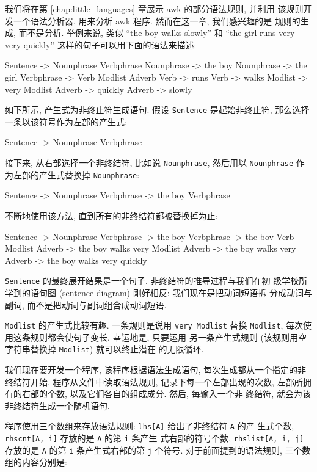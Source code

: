 {我们将在第 \ref{chap:little_languages} 章展示 awk 的部分语法规则, 并利用
该规则开发一个语法分析器, 用来分析 awk 程序. 然而在这一章, 我们感兴趣的是
规则的生成, 而不是分析. 举例来说, 类似 ``the boy walks slowly'' 和 ``the
girl runs very very quickly'' 这样的句子可以用下面的语法来描述:
\begin{file}
    Sentence -> Nounphrase Verbphrase
    Nounphrase -> the boy
    Nounphrase -> the girl
    Verbphrase -> Verb Modlist Adverb
    Verb -> runs
    Verb -> walks
    Modlist -> very Modlist
    Adverb -> quickly
    Adverb -> slowly
\end{file}

如下所示, 产生式为非终止符生成语句. 假设 \texttt{Sentence} 是起始非终止符,
那么选择一条以该符号作为左部的产生式:
\begin{file}
    Sentence -> Nounphrase Verbphrase
\end{file}
接下来, 从右部选择一个非终结符, 比如说 \texttt{Nounphrase}, 然后用以
\texttt{Nounphrase} 作为左部的产生式替换掉 \texttt{Nounphrase}:
\begin{file}
    Sentence -> Nounphrase Verbphrase
             -> the boy Verbphrase
\end{file}
不断地使用该方法, 直到所有的非终结符都被替换掉为止:
\begin{file}
    Sentence -> Nounphrase Verbphrase
             -> the boy Verbphrase
             -> the bov Verb Modlist Adverb
             -> the boy walks very Modlist Adverb
             -> the boy walks very Adverb
             -> the boy walks very quickly
\end{file}
\texttt{Sentence} 的最终展开结果是一个句子. 非终结符的推导过程与我们在初
级学校所学到的语句图 (sentence-diagram) 刚好相反: 我们现在是把动词短语拆
分成动词与副词, 而不是把动词与副词组合成动词短语.

\texttt{Modlist} 的产生式比较有趣. 一条规则是说用 \texttt{very Modlist}
替换 \texttt{Modlist}, 每次使用这条规则都会使句子变长. 幸运地是, 只要运用
另一条产生式规则 (该规则用空字符串替换掉 \texttt{Modlist}) 就可以终止潜在
的无限循环.

我们现在要开发一个程序, 该程序根据语法生成语句, 每次生成都从一个指定的非
终结符开始. 程序从文件中读取语法规则, 记录下每一个左部出现的次数, 
左部所拥有的右部的个数, 以及它们各自的组成成分. 然后, 每输入一个非
终结符, 就会为该非终结符生成一个随机语句.

程序使用三个数组来存放语法规则:
\texttt{lhs[A]} 给出了非终结符 \texttt{A} 的产 
生式个数, \texttt{rhscnt[A, i]} 存放的是 \texttt{A} 的第 \texttt{i} 条产生
式右部的符号个数, \texttt{rhslist[A, i, j]} 存放的是 \texttt{A} 的第 
\texttt{i} 条产生式右部的第 \texttt{j} 个符号. 对于前面提到的语法规则, 
三个数组的内容分别是:
\begin{tabular}{ccc}


\end{tabular}}
